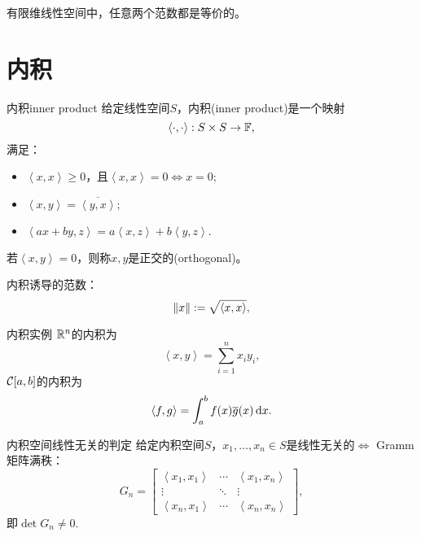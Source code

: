 \begin{theorem}
    {}{}
    有限维线性空间中，任意两个范数都是等价的。
\end{theorem}


\section{内积}
\label{sec:inner product}

\newcommand{\inp}[2]{\left\langle #1,#2\right\rangle}  %


\begin{definition}
    {内积}{inner product}
    给定线性空间$S$，内积(inner product)是一个映射
    \begin{equation}
        \inp\cdot\cdot:S\times S\to\FF,
    \end{equation}
    满足：
    \begin{itemize}
        \item $\inp xx\geq 0$，且$\inp xx=0\iff x=0;$
        \item $\inp xy=\overline{\inp yx};$
        \item $\inp{ax+by}z=a\inp xz+b\inp yz.$
    \end{itemize}
    若$\inp xy=0$，则称$x,y$是正交的(orthogonal)。
\end{definition}

内积诱导的范数：
\begin{equation}
    \norm x:=\sqrt{\inp xx},
\end{equation}

\begin{example}
    {内积实例}{}
    $\mathbb R^n$的内积为
    \[
        \inp xy=\sum_{i=1}^nx_iy_i,
    \]
    $\mathcal C[a,b]$的内积为 
    \[
        \inp fg=\int_a^bf(x)\overline g(x)\d x.
    \]
\end{example}

\begin{theorem}
    {内积空间线性无关的判定}{}
    给定内积空间$S$，$x_1,\ldots,x_n\in S$是线性无关的$\iff$ Gramm矩阵满秩：
    \begin{equation}
        G_n=\begin{bmatrix}
            \inp{x_1}{x_1}&\cdots&\inp{x_1}{x_n}\\
            \vdots&\ddots&\vdots\\
            \inp{x_n}{x_1}&\cdots&\inp{x_n}{x_n}
        \end{bmatrix},
    \end{equation}
    即$\det G_n\neq 0.$
\end{theorem}

